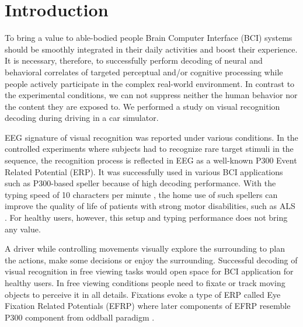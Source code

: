 \documentclass[12pt]{iopart}
\begin{document}

\section{Introduction}
\label{sec:intro}


To bring a value to able-bodied people 
Brain Computer Interface (BCI) systems should be smoothly 
integrated in their daily activities and boost their experience. 
It is necessary, therefore, to successfully perform decoding
of neural and behavioral correlates of targeted perceptual
and/or cognitive processing while people actively participate
in the complex real-world environment. In contrast to the
experimental conditions, we can not suppress neither 
the human behavior nor the content they are exposed to.
We performed a study on visual recognition decoding during driving in a car simulator. 

EEG signature of visual recognition was reported
under various conditions.
In the controlled experiments where subjects had to recognize
rare target stimuli in the sequence, the recognition process
is reflected in EEG as a well-known P300 Event Related Potential (ERP).
It was successfully used in various BCI applications such as
P300-based speller because of high decoding performance.
With the typing speed of 10 characters per minute \cite{rezeika_braincomputer_2018},
the home use of such spellers can improve the quality of life
of patients with strong motor disabilities, such as ALS \cite{sellers_brain-computer_2010,holz_long-term_2015}.
For healthy users, however, this setup and typing performance does not bring any value.

A driver while controlling movements visually explore the surrounding
to plan the actions, make some decisions or enjoy the surrounding.
Successful decoding of visual recognition in free viewing tasks
would open space for BCI application for healthy users.
In free viewing conditions people need to fixate
or track moving objects to perceive it in all details.
Fixations evoke a type of ERP called Eye Fixation Related Potentials (EFRP)
where later components of EFRP resemble P300 component from oddball paradigm \cite{brouwer_distinguishing_2013}.
\end{document}
